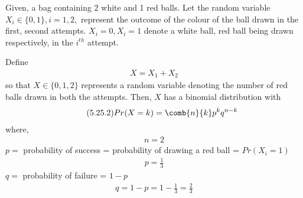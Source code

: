 Given, a bag containing 2 white and 1 red balls. Let the random variable $X_{i}\in\{0,1\},i=1,2,$ represent the outcome of the colour of the ball drawn in the first, second attempts. $X_{i}=0,X_{i}=1$ denote a white ball, red ball being drawn respectively, in the $i^{th}$ attempt.
\begin{comment}
As the ball drawn in the first attempt is replaced in the bag, for both the attempts, the number of balls of a specified colour, and their probability  mass function's (pmf's) remain the same. i.e, 
\begin{align}
    \tag{5.25.1}
    n(X_{i}=0)=2\\
    \tag{5.25.2}
    n(X_{i}=1)=1\\
    \tag{5.25.3}
    \therefore n(X_{i}=0)+n(X_{i}=1)=3 
\end{align}
and
\begin{align}
    \tag{5.25.4}
    \Pr(X_{i}=j) = 
	\begin{cases}
	\dfrac{2}{3}, &j=0 \\~\\[-1em]
	\dfrac{1}{3}, &j=1 \\~\\[-1em]
	0, & otherwise
	\end{cases}
\end{align}
\newpage
\end{comment}
\newline
\newline
Define 
\begin{align}
    \tag{5.25.1}
    X=X_{1}+X_{2}
\end{align}
so that $X\in\{0,1,2\}$ represents a random variable denoting the number of red balls drawn in both the attempts. Then, $X$ has a binomial distribution with 
\begin{align}
    \tag{5.25.2}
    Pr(X=k)={\comb{n}{k}}p^{k}q^{n-k}
    \label{eq:binomialdistr}
\end{align}
where,
\begin{align}
    \tag{5.25.3}
    n=2
\end{align}
$p =$ probability of success = probability of drawing a red ball = $Pr(X_{i}=1)$
\begin{align}
    \tag{5.25.4}
    p=\frac{1}{3}
\end{align}
$q =$ probability of failure = $1-p$
\begin{align}
    \tag{5.25.5}
    q=1-p=1-\frac{1}{3}=\frac{2}{3}
\end{align}
\newline
